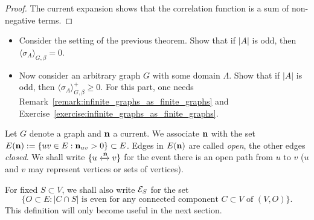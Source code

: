 \begin{proof}
    The current expansion shows that the correlation function is a sum of
    non-negative terms.
\end{proof}

\begin{exercise}
    \label{exo:correlation_functions_with_odd_sets}
    \begin{itemize}
        \item     Consider the setting of the previous theorem.
        Show that if $|A|$ is odd, then $\langle\sigma_A\rangle_{G,\beta}=0$.
        \item Now consider an arbitrary graph $G$ with some domain $\Lambda$.
        Show that if $|A|$ is odd, then $\langle\sigma_A\rangle_{G,\beta}^+\geq 0$.
        For this part, one needs Remark~\ref{remark:infinite_graphs_as_finite_graphs}
        and Exercise~\ref{exercise:infinite_graphs_as_finite_graphs}.
    \end{itemize}
\end{exercise}

\begin{definition}
    Let $G$ denote a graph and $\mathbf{n}$ a current.
    We associate $\mathbf{n}$ with the set $E(\mathbf{n}):=\{uv\in E:\mathbf{n}_{uv}>0\}\subset E$.
    Edges in $E(\mathbf{n})$ are called \emph{open},
    the other edges \emph{closed}.
    We shall write $\{u\xleftrightarrow{\mathbf{n}}v\}$
    for the event there is an open path from $u$ to $v$
    ($u$ and $v$ may represent vertices or sets of vertices).

    For fixed $S\subset V$, we shall also write $\mathcal E_S$ for the set
    \[
        \{O\subset E:\text{$|C\cap S|$ is even for any connected component $C\subset V$ of $(V,O)$}\}.
    \]
    This definition will only become useful in the next section.
\end{definition}

